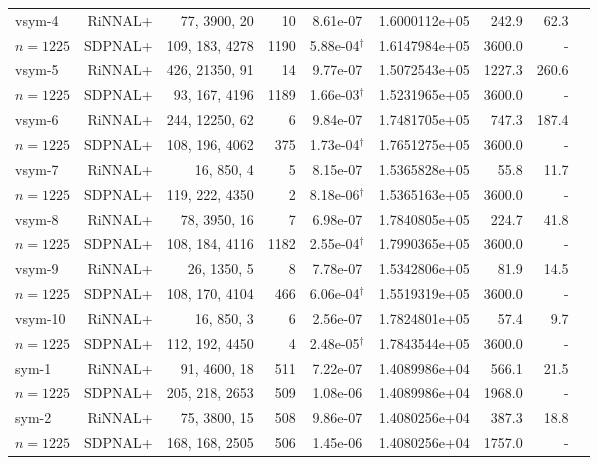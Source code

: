 \documentclass[11pt]{article}
\theoremstyle{plain}
\begin{document}
\begin{footnotesize}
\begin{longtable}[c]{lrrrccrrr}
vsym-4& RiNNAL+ & 77, 3900, 20 & 10 & 8.61e-07 & 1.6000112e+05 & 242.9 &62.3 \\ 
$n=1225$ & SDPNAL+ & 109, 183, 4278 & 1190& 5.88e-04$^{\dagger}$ & 1.6147984e+05 & 3600.0 & - \\ [3pt] 

vsym-5& RiNNAL+ & 426, 21350, 91 & 14 & 9.77e-07 & 1.5072543e+05 & 1227.3 &260.6 \\ 
$n=1225$ & SDPNAL+ & 93, 167, 4196 & 1189& 1.66e-03$^{\dagger}$ & 1.5231965e+05 & 3600.0 & - \\ [3pt] 

vsym-6& RiNNAL+ & 244, 12250, 62 & 6 & 9.84e-07 & 1.7481705e+05 & 747.3 &187.4 \\ 
$n=1225$ & SDPNAL+ & 108, 196, 4062 & 375& 1.73e-04$^{\dagger}$ & 1.7651275e+05 & 3600.0 & - \\ [3pt] 

vsym-7& RiNNAL+ & 16, 850, 4 & 5 & 8.15e-07 & 1.5365828e+05 & 55.8 &11.7 \\ 
$n=1225$ & SDPNAL+ & 119, 222, 4350 & 2& 8.18e-06$^{\dagger}$ & 1.5365163e+05 & 3600.0 & - \\ [3pt] 

vsym-8& RiNNAL+ & 78, 3950, 16 & 7 & 6.98e-07 & 1.7840805e+05 & 224.7 &41.8 \\ 
$n=1225$ & SDPNAL+ & 108, 184, 4116 & 1182& 2.55e-04$^{\dagger}$ & 1.7990365e+05 & 3600.0 & - \\ [3pt] 

vsym-9& RiNNAL+ & 26, 1350, 5 & 8 & 7.78e-07 & 1.5342806e+05 & 81.9 &14.5 \\ 
$n=1225$ & SDPNAL+ & 108, 170, 4104 & 466& 6.06e-04$^{\dagger}$ & 1.5519319e+05 & 3600.0 & - \\ [3pt] 

vsym-10& RiNNAL+ & 16, 850, 3 & 6 & 2.56e-07 & 1.7824801e+05 & 57.4 &9.7 \\ 
$n=1225$ & SDPNAL+ & 112, 192, 4450 & 4& 2.48e-05$^{\dagger}$ & 1.7843544e+05 & 3600.0 & - \\ [3pt] 

sym-1& RiNNAL+ & 91, 4600, 18 & 511 & 7.22e-07 & 1.4089986e+04 & 566.1 &21.5 \\ 
$n=1225$ & SDPNAL+ & 205, 218, 2653 & 509& 1.08e-06 & 1.4089986e+04 & 1968.0 & - \\ [3pt] 

sym-2& RiNNAL+ & 75, 3800, 15 & 508 & 9.86e-07 & 1.4080256e+04 & 387.3 &18.8 \\ 
$n=1225$ & SDPNAL+ & 168, 168, 2505 & 506& 1.45e-06 & 1.4080256e+04 & 1757.0 & - \\ [3pt] 


\end{longtable}
\end{footnotesize}
\end{document}
